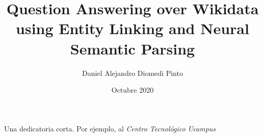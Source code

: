 \documentclass[upright, contnum]{umemoria}
\author{Daniel Alejandro Diomedi Pinto}
\title{Question Answering over Wikidata using Entity Linking and Neural Semantic Parsing}
\date{Octubre 2020}
\begin{document}
\frontmatter
\maketitle

\begin{resumen}
    {\lipsum[1-4]}
\end{resumen}

\begin{abstract}
    {\lipsum[1-4]}
\end{abstract}

\begin{dedicatoria} %
Una dedicatoria corta. Por ejemplo, al \emph{Centro Tecnológico Ucampus}
\end{dedicatoria}

\begin{thanks} %
\lipsum[1-2]
\end{thanks}
\cleardoublepage

\tableofcontents
\listoftables %
\listoffigures %

\mainmatter











\end{document}

